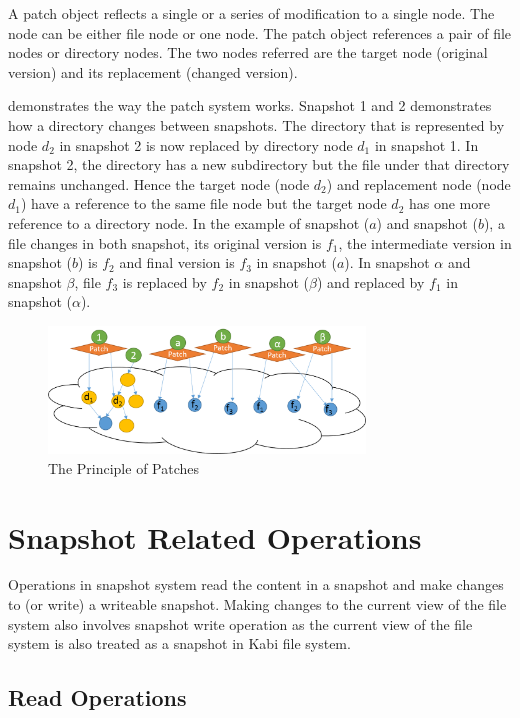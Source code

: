     A patch object reflects a single or a series of modification to a single node. The node can be either file node or one node. The patch object references a pair of file nodes or directory nodes. The two nodes referred are the target node (original version) and its replacement (changed version).

     demonstrates the way the patch system works. Snapshot 1 and 2 demonstrates how a directory changes between snapshots. The directory that is represented by node $d_2$ in snapshot 2 is now replaced by directory node $d_1$ in snapshot 1. In snapshot 2, the directory has a new subdirectory but the file under that directory remains unchanged. Hence the target node (node $d_2$) and replacement node (node $d_1$) have a reference to the same file node but the target node $d_2$ has one more reference to a directory node. In the example of snapshot ($a$) and snapshot ($b$), a file changes in both snapshot, its original version is $f_1$, the intermediate version in snapshot ($b$) is $f_2$ and final version is $f_3$ in snapshot ($a$). In snapshot $\alpha$ and snapshot $\beta$, file $f_3$ is replaced by $f_2$ in snapshot ($\beta$) and replaced by $f_1$ in snapshot ($\alpha$).  

\begin{figure}[t]
\centering
\includegraphics[width=0.75\textwidth]{Chapter-4/figs/fig14.png}
\caption{The Principle of Patches}
\label{fig:patches}
\end{figure}

\section{Snapshot Related Operations}

    Operations in snapshot system read the content in a snapshot and make changes to (or write) a writeable snapshot. Making changes to the current view of the file system also involves snapshot write operation as the current view of the file system is also treated as a snapshot in Kabi file system.

\subsection{Read Operations}

